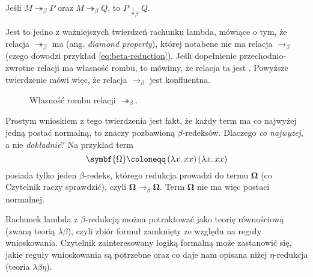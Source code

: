 \documentclass[polish,pretty]{angav}
\newcommand{\toto}{\twoheadrightarrow}
\begin{document}
\begin{theorem}
    Jeśli $M \toto_\beta P$ oraz $M \toto_\beta Q$, to $P \downarrow_\beta Q$.
\end{theorem}

Jest to jedno z ważniejszych twierdzeń rachunku lambda, mówiące o tym, że relacja $\toto_\beta$ ma  (ang. \textit{diamond property}), której notabene nie ma relacja $\to_\beta$ (czego dowodzi przykład \ref{eq:beta-reduction}). Jeśli dopełnienie przechodnio-zwrotne relacji ma własność rombu, to mówimy, że relacja ta jest . Powyższe twierdzenie mówi więc, że relacja $\to_\beta$ jest konfluentna.

\begin{figure}[H]
    \centering
    \caption{Własność rombu relacji $\toto_\beta$.}
    \label{fig:church-rosser}
\end{figure}

Prostym wnioskiem z tego twierdzenia jest fakt, że każdy term ma co najwyżej jedną postać normalną, to znaczy pozbawioną $\beta$-redeksów.
Dlaczego \emph{co najwyżej}, a nie \emph{dokładnie}? Na przykład term
\[ \symbf{\Omega} \coloneqq \left(\lambda x\ldotp xx\right)\left(\lambda x\ldotp xx\right) \]
posiada tylko jeden $\beta$-redeks, którego redukcja prowadzi do termu $\symbf{\Omega}$ (co Czytelnik raczy sprawdzić), czyli $\symbf{\Omega} \to_\beta \symbf{\Omega}$. Term $\symbf{\Omega}$ nie ma więc postaci normalnej.

\begin{remark}
    Rachunek lambda z $\beta$-redukcją można potraktować jako teorię równościową (zwaną teorią $\lambda\beta$), czyli zbiór formuł zamknięty ze względu na reguły wnioskowania. Czytelnik zainteresowany logiką formalną może zastanowić się, jakie reguły wnioskowania są potrzebne oraz co daje nam opisana niżej $\eta$-redukcja (teoria $\lambda\beta\eta$).
\end{remark}
\end{document}
